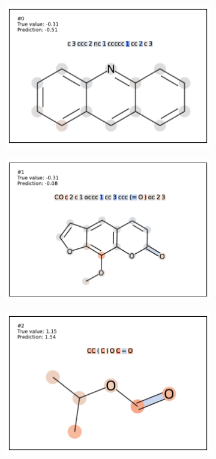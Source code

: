 
\begin{figure}
\centering
\begin{subfigure}[b]{0.33\textwidth} 
  \centering 
  \includegraphics[width=\textwidth]{figures/esol/esol0.pdf} 
\end{subfigure}\begin{subfigure}[b]{0.33\textwidth} 
  \centering 
  \includegraphics[width=\textwidth]{figures/esol/esol1.pdf} 
\end{subfigure}\begin{subfigure}[b]{0.33\textwidth} 
  \centering 
  \includegraphics[width=\textwidth]{figures/esol/esol2.pdf} 

\end{subfigure}
\end{figure}
